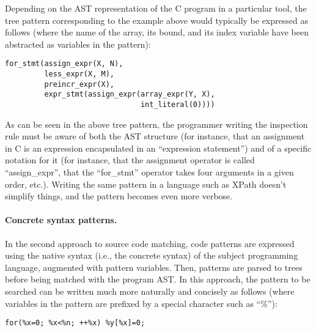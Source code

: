 Depending on the AST representation of the C program in a particular
tool, the tree pattern corresponding to the example above would
typically be expressed as follows (where the name of the array, its
bound, and its index variable have been abstracted as variables in the
pattern):
\begin{verbatim}
for_stmt(assign_expr(X, N), 
         less_expr(X, M), 
         preincr_expr(X),
         expr_stmt(assign_expr(array_expr(Y, X), 
                               int_literal(0))))
\end{verbatim}

As can be seen in the above tree pattern, the programmer writing the
inspection rule must be aware of both the AST structure (for instance,
that an assignment in C is an expression encapsulated in an
``expression statement'') and of a specific notation for it (for
instance, that the assignment operator is called ``assign\_expr'',
that the ``for\_stmt'' operator takes four arguments in a given order,
etc.). Writing the same pattern in a language such as XPath doesn't
simplify things, and the pattern becomes even more verbose.

\paragraph{Concrete syntax patterns.}
In the second approach to source code matching, code patterns are
expressed using the native syntax (i.e., the concrete syntax) of the
subject programming language, augmented with pattern variables. Then,
patterns are parsed to trees before being matched with the program
AST. In this approach, the pattern to be searched can be written much
more naturally and concisely as follows (where variables in the
pattern are prefixed by a special character such as ``\%''):
\begin{verbatim}
for(%x=0; %x<%n; ++%x) %y[%x]=0;
\end{verbatim}

